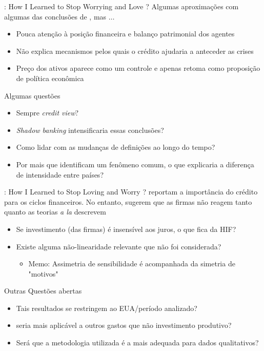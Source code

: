 \documentclass[presentation]{beamer}
\begin{document}
\begin{frame}[label={sec:org33c901b}]{\textcite{schularickCreditBoomsGone2012}: How I Learned to Stop Worrying and Love \textcite{minsky_1977_Financial}?}
Algumas aproximações com algumas das conclusões de \textcite{minsky_1977_Financial}, mas \(\ldots\)

\begin{itemize}
\item Pouca atenção à posição financeira e balanço patrimonial dos agentes
\item Não explica mecanismos pelos quais o crédito ajudaria a anteceder as crises
\item Preço dos ativos aparece como um controle e apenas retoma como proposição de política econômica
\end{itemize}

\begin{block}{Algumas questões}
\begin{itemize}
\item Sempre \emph{credit view}?
\item \emph{Shadow banking} intensificaria essas conclusões?
\item Como lidar com as mudanças de definições ao longo do tempo?
\item Por mais que identificam um fenômeno comum, o que explicaria a diferença de intensidade entre países?
\end{itemize}
\end{block}
\end{frame}

\begin{frame}[label={sec:orgcd7ef7c}]{\textcite{sharpe_2020_Why}: How I Learned to Stop Loving and Worry \textcite{minsky_1977_Financial}?}
\textcite{schularickCreditBoomsGone2012} reportam a importância do crédito para os ciclos financeiros. No entanto, \textcite{sharpe_2020_Why} sugerem que as firmas não reagem tanto quanto as teorias \emph{a la} \cite{minsky_1977_Financial} descrevem

\begin{itemize}
\item Se investimento (das firmas) é insensível aos juros, o que fica da HIF?
\item Existe alguma não-linearidade relevante que não foi considerada?
\begin{itemize}
\item \alert{Memo:} Assimetria de sensibilidade é acompanhada da simetria de "motivos"
\end{itemize}
\end{itemize}

\begin{block}{Outras Questões abertas}
\begin{itemize}
\item Tais resultados se restringem ao EUA/período analizado?
\item \textcite{minsky_1977_Financial} seria mais aplicável a outros gastos que não investimento produtivo?
\item Será que a metodologia utilizada é a mais adequada para dados qualitativos?
\end{itemize}
\end{block}
\end{frame}
\end{document}
